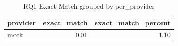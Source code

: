 \begin{table}
\caption{RQ1 Exact Match grouped by per_provider}
\label{tab:rq1_per_provider}
\begin{tabular}{lrr}
\toprule
provider & exact_match & exact_match_percent \\
\midrule
mock & 0.01 & 1.10 \\
\bottomrule
\end{tabular}
\end{table}
